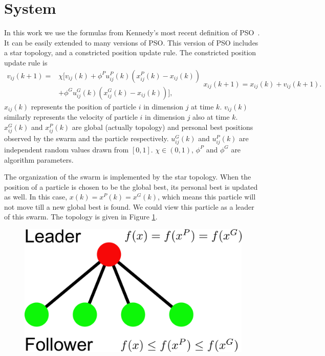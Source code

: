 \section{System}
\label{sec:system}

In this work we use the formulas from Kennedy's most recent definition of PSO~\cite{4223164}.
It can be easily extended to many versions of PSO.
This version of PSO includes a star topology, and a constricted position update rule. 
The constricted position update rule is
\begin{subequations}
\label{eq:pso_alg}
\begin{equation}
\label{eq:up_vel}
\begin{aligned}
v_{ij}(k+1) = &  \chi [ v_{ij}(k) 
 + \phi^{P} u^{P}_{ij}(k) (x^{P}_{ij}(k) - x_{ij}(k))\\
 & + \phi^{G} u^{G}_{ij}(k) ( x^{G}_{ij}(k) - x_{ij}(k)) ],
\end{aligned}
\end{equation}
\begin{equation}
\label{eq:up_pos}
x_{ij}(k+1) = x_{ij}(k) + v_{ij}(k+1).
\end{equation}
\end{subequations}
$ x_{ij}(k) $ represents the position of particle $ i $ in dimension $ j $ at time $ k $.
$ v_{ij}(k) $ similarly represents the velocity of particle $ i $ in dimension $ j $ also at time $ k $.
$ x^{G}_{ij}(k) $ and $ x^{P}_{ij}(k) $ are global (actually topology) and personal best positions observed by the swarm and the particle respectively. 
$ u^{G}_{ij}(k) $ and $ u^{P}_{ij}(k) $ are independent random values drawn from $ [0,1] $.
$ \chi \in ( 0, 1 ) $, $ \phi^{P} $ and $ \phi^{G} $ are algorithm parameters.

The organization of the swarm is implemented by the star topology.
When the position of a particle is chosen to be the global best, its personal best is updated as well.
In this case, $ x(k) = x^{P}(k) = x^{G}(k) $, which means this particle will not move till a new global best is found.
We could view this particle as a leader of this swarm.
The topology is given in Figure \ref{fig:leader_follower}.

\begin{figure}[tbph]
\centering
\includegraphics[width=0.5\linewidth]{./fig/leader_follower}
\caption{}
\label{fig:leader_follower}
\end{figure}


